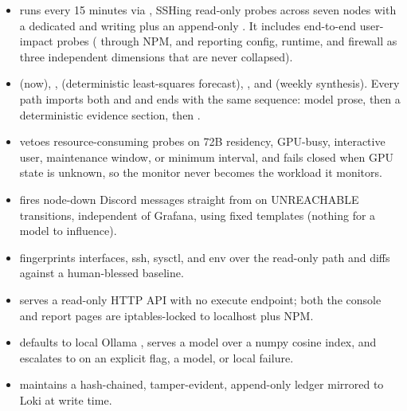 \begin{itemize}
\item {}  runs every 15 minutes via
, SSHing read-only probes across seven nodes with a dedicated
 and writing  plus an append-only .
It includes end-to-end user-impact probes ( through NPM, and
 reporting config, runtime, and firewall as three independent
dimensions that are never collapsed).
\item {}  (now), ,
 (deterministic least-squares forecast), ,
and  (weekly synthesis). Every path imports both 
and  and ends with the same sequence: model prose, then a deterministic
evidence section, then .
\item {}  vetoes resource-consuming probes on
72B residency, GPU-busy, interactive user, maintenance window, or minimum interval, and fails
closed when GPU state is unknown, so the monitor never becomes the workload it monitors.
\item {}  fires node-down Discord messages
straight from  on UNREACHABLE transitions, independent of Grafana, using
fixed templates (nothing for a model to influence).
\item {}  fingerprints interfaces, ssh, sysctl, and
env over the read-only path and diffs against a human-blessed baseline.
\item {}  serves a read-only HTTP API with no execute
endpoint; both the console and report pages are iptables-locked to localhost plus NPM.
\item {}  defaults to local Ollama ,
serves a  model over a numpy cosine index, and escalates to 
on an explicit flag, a  model, or local failure.
\item {}  maintains a hash-chained, tamper-evident, append-only
ledger mirrored to Loki at write time.
\end{itemize}

